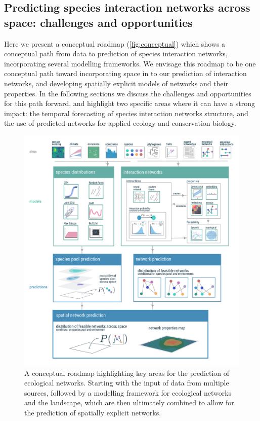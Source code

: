 \begin{refsection}
\section{Predicting species interaction networks across space:
challenges and
opportunities}\label{predicting-species-interaction-networks-across-space-challenges-and-opportunities}

Here we present a conceptual roadmap (\autoref{fig:conceptual}) which shows a
conceptual path from data to prediction of species interaction networks,
incorporating several modelling frameworks. We envisage this roadmap to
be one conceptual path toward incorporating space in to our prediction
of interaction networks, and developing spatially explicit models of
networks and their properties. In the following sections we discuss the
challenges and opportunities for this path forward, and highlight two
specific areas where it can have a strong impact: the temporal
forecasting of species interaction networks structure, and the use of
predicted networks for applied ecology and conservation biology.

\begin{figure}[h]
    \centering
    \includegraphics[width=\textwidth]{figures/concept_v6.png}
    \caption{A conceptual roadmap highlighting key areas for the prediction
of ecological networks. Starting with the input of data from multiple
sources, followed by a modelling framework for ecological networks and
the landscape, which are then ultimately combined to allow for the
prediction of spatially explicit networks.}
    \label{fig:conceptual}
\end{figure}


\end{refsection}
